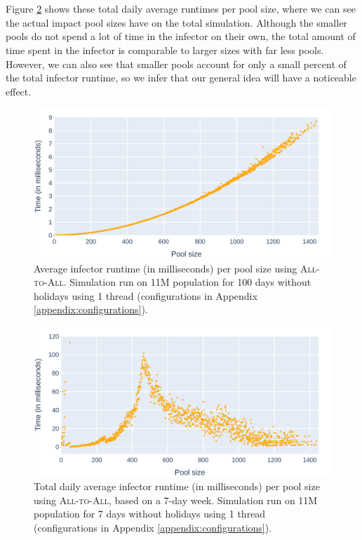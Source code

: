 \\\\
Figure \ref{fig:standard_times_all_totals_weekly} shows these total daily average runtimes per pool size, where we can see the actual impact pool sizes have on the total simulation. Although the smaller pools do not spend a lot of time in the infector on their own, the total amount of time spent in the infector is comparable to larger sizes with far less pools. However, we can also see that smaller pools account for only a small percent of the total infector runtime, so we infer that our general idea will have a noticeable effect.

\begin{figure}
    \centering
    \includegraphics[width=\linewidth]{4 - Sampling/fig/standard/standard_times_all_averages.png}
    \caption{Average infector runtime (in milliseconds) per pool size using \textsc{All-to-All}. Simulation run on 11M population for 100 days without holidays using 1 thread (configurations in Appendix \ref{appendix:configurations}).}
    \label{fig:standard_times_all_averages}
\end{figure}

\begin{figure}
    \centering
    \includegraphics[width=\linewidth]{4 - Sampling/fig/standard/standard_times_all_totals_weekly.png}
    \caption{Total daily average infector runtime (in milliseconds) per pool size using \textsc{All-to-All}, based on a 7-day week. Simulation run on 11M population for 7 days without holidays using 1 thread (configurations in Appendix \ref{appendix:configurations}).}
    \label{fig:standard_times_all_totals_weekly}
\end{figure}

